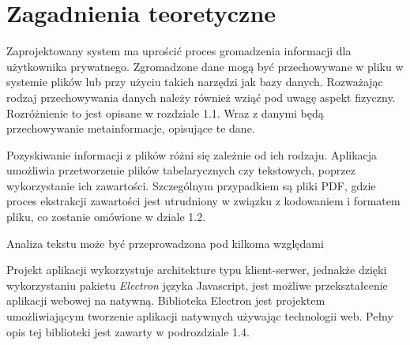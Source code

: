\documentclass[12pt,a4paper,twoside]{article}
\begin{document}
\section{Zagadnienia teoretyczne}
Zaprojektowany system ma uprościć proces gromadzenia informacji dla użytkownika prywatnego. Zgromadzone dane mogą być przechowywane w pliku w systemie plików lub przy użyciu takich narzędzi jak bazy danych. Rozważając rodzaj przechowywania danych należy również wziąć pod uwagę aspekt fizyczny. Rozróżnienie to jest opisane w rozdziale 1.1. Wraz z danymi będą przechowywanie metainformacje, opisujące te dane.  \par
Pozyskiwanie informacji z plików różni się zależnie od ich rodzaju. Aplikacja umożliwia przetworzenie plików tabelarycznych czy tekstowych, poprzez wykorzystanie ich zawartości. Szczególnym przypadkiem są pliki PDF, gdzie proces ekstrakcji zawartości jest utrudniony w związku z kodowaniem i formatem pliku, co zostanie omówione w dziale 1.2. \par
Analiza tekstu może być przeprowadzona pod kilkoma względami\par
Projekt aplikacji wykorzystuje architekture typu klient-serwer, jednakże dzięki wykorzystaniu pakietu \textit{Electron} języka Javascript, jest możliwe przekształcenie aplikacji webowej na natywną. Biblioteka Electron jest projektem umożliwiającym tworzenie aplikacji natywnych używając technologii web. Pełny opis tej biblioteki jest zawarty w podrozdziale 1.4. 
\end{document}
